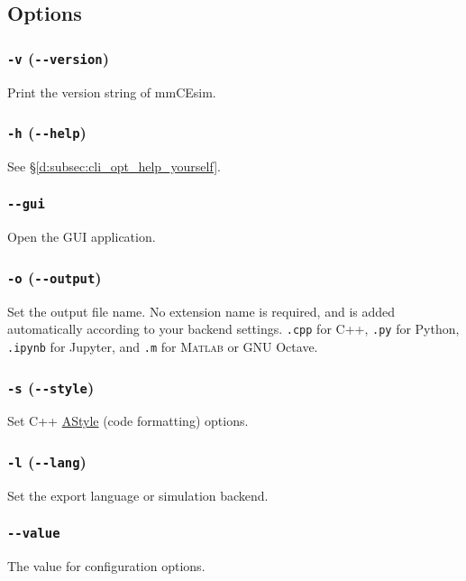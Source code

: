 \subsection{Options}

\subsubsection{\texttt{-v} (\texttt{-{}-version})}
Print the version string of mmCEsim.

\subsubsection{\texttt{-h} (\texttt{-{}-help})}
See \S\ref{d:subsec:cli_opt_help_yourself}.

\subsubsection{\texttt{-{}-gui}}
Open the GUI application.

\subsubsection{\texttt{-o} (\texttt{-{}-output})}
Set the output file name.
No extension name is required, and is added automatically according to your backend settings.
\texttt{.cpp} for C++, \texttt{.py} for Python, \texttt{.ipynb} for Jupyter,
and \texttt{.m} for \textsc{Matlab} or GNU Octave.

\subsubsection{\texttt{-s} (\texttt{-{}-style})}
Set C++ \href{https://astyle.sourceforge.net/astyle.html}{AStyle} (code formatting) options.

\subsubsection{\texttt{-l} (\texttt{-{}-lang})}
Set the export language or simulation backend.

\subsubsection{\texttt{-{}-value}}
The value for configuration options.

